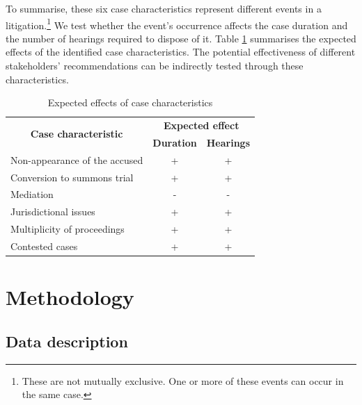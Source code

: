 \documentclass[12pt,a4paper]{article}
\begin{document}
To summarise, these six case characteristics represent different events in a litigation.\footnote{These are not mutually exclusive. One or more of these events can occur in the same case.} We test whether the event's occurrence affects the case duration and the number of hearings required to dispose of it. Table \ref{tab:expected} summarises the expected effects of the identified case characteristics. The potential effectiveness of different stakeholders' recommendations can be indirectly tested through these characteristics.

\begin{table}[!ht]
\caption{Expected effects of case characteristics}
\label{tab:expected}
\centering
\footnotesize
\begin{tabular}{@{}lcc@{}}
\toprule
\multicolumn{1}{c}{\multirow{2}{*}{\textbf{Case characteristic}}} & \multicolumn{2}{c}{\textbf{Expected effect}} \\ \cmidrule(l){2-3}
\multicolumn{1}{c}{} & \textbf{Duration} & \textbf{Hearings} \\ \midrule
Non-appearance of the accused & + & + \\
Conversion to summons trial & + & + \\
Mediation & - & - \\
Jurisdictional issues & + & + \\
Multiplicity of proceedings & + & + \\
Contested cases & + & + \\ \bottomrule
\end{tabular}
\end{table}

\section{Methodology}
\label{sec:methodology}

\subsection{Data description} \label{sec:data-description}
\end{document}
